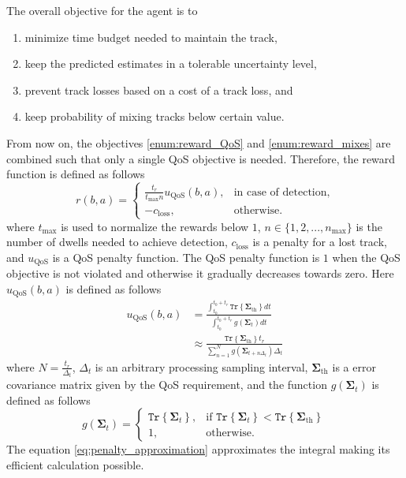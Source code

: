 \documentclass[english, 12pt, a4paper, elec, utf8, a-1b, online]{aaltothesis}
\newcommand{\tr}[1]{\texttt{Tr}\left\{ #1 \right\}}
\newcommand{\tmax}{t_\text{max}}
\newcommand{\nmax}{n_\text{max}}
\newcommand{\priorecovth}{\bm{\Sigma}_{\text{th}}}
\begin{document}
\newcommand{\uqos}{u_\text{QoS}}
\newcommand{\closs}{c_\text{loss}}
The overall objective for the agent is to 
\begin{enumerate}
    \item minimize time budget needed to maintain the track, \label{enum:reward_tbm}
    \item keep the predicted estimates in a tolerable uncertainty level, \label{enum:reward_QoS}
    \item prevent track losses based on a cost of a track loss, and \label{enum:reward_losses}
    \item keep probability of mixing tracks below certain value. \label{enum:reward_mixes}
\end{enumerate}
From now on, the objectives \ref{enum:reward_QoS} and \ref{enum:reward_mixes} are combined such that only a single QoS objective is needed.
Therefore, the reward function is defined as follows
\begin{equation} \label{eq:reward}
    r(b, a) =
    \left\{
    \begin{array}{ll}
        \frac{t_r}{\tmax n} \uqos(b, a), & \text{in case of detection,} \\
        -\closs, & \text{otherwise.}
    \end{array}\right. 
\end{equation}
where $\tmax$ is used to normalize the rewards below $1$, $n \in \{1, 2, ..., \nmax\}$ is the number of dwells needed to achieve detection, $\closs$ is a penalty for a lost track, and $\uqos$ is a QoS penalty function.
The QoS penalty function is $1$ when the QoS objective is not violated and otherwise it gradually decreases towards zero.
Here $\uqos(b, a)$ is defined as follows
\begin{align}
    \uqos(b, a)
    &= \frac{\int_{t_0}^{t_0+t_r} \tr{\priorecovth} dt}{\int_{t_0}^{t_0+t_r}  g(\bm{\Sigma}_t) dt} \\
    &\approx \frac{\tr{\priorecovth} t_r}{\sum_{n=1}^{N} g(\bm{\Sigma}_{t+n\Delta_t}) \Delta_t} \label{eq:penalty_approximation}
\end{align}
where $N=\frac{t_r}{\Delta_t}$, $\Delta_t$ is an arbitrary processing sampling interval, $\priorecovth$ is a error covariance matrix given by the QoS requirement, and the function $g(\bm{\Sigma}_t)$ is defined as follows
\begin{equation}
    g(\bm{\Sigma}_t) =
    \left\{
    \begin{array}{ll}
        \tr{\bm{\Sigma}_t}, & \text{if } \tr{\bm{\Sigma}_t} < \tr{\priorecovth} \\
        1, & \text{otherwise.}
    \end{array}
    \right.
\end{equation}
The equation \eqref{eq:penalty_approximation} approximates the integral making its efficient calculation possible.
\end{document}
